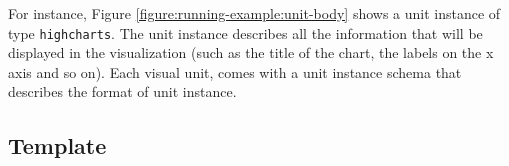 For instance, Figure \ref{figure:running-example:unit-body} shows a unit instance of type \texttt{highcharts}. The unit instance describes all the information that will be displayed in the visualization (such as the title of the chart, the labels on the x axis and so on). Each visual unit, comes with a unit instance schema that describes the format of unit instance.



\subsection{Template}
\label{section:template}

